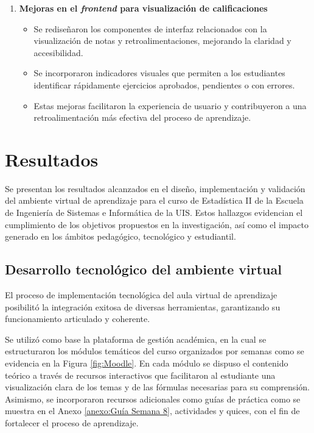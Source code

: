 \documentclass[letter,oneside,12pt,spanish]{report}
\begin{document}
\begin{enumerate}
	\item \textbf{Mejoras en el \textit{frontend} para visualización de calificaciones}  
	\begin{itemize}
		\item Se rediseñaron los componentes de interfaz relacionados con la visualización de notas y retroalimentaciones, mejorando la claridad y accesibilidad.
		\item Se incorporaron indicadores visuales que permiten a los estudiantes identificar rápidamente ejercicios aprobados, pendientes o con errores.
		\item Estas mejoras facilitaron la experiencia de usuario y contribuyeron a una retroalimentación más efectiva del proceso de aprendizaje.
	\end{itemize}
\end{enumerate}

\newpage

\chapter{Resultados}

Se presentan los resultados alcanzados en el diseño, implementación y validación del ambiente virtual de aprendizaje para el curso de Estadística II de la Escuela de Ingeniería de Sistemas e Informática de la UIS. Estos hallazgos evidencian el cumplimiento de los objetivos propuestos en la investigación, así como el impacto generado en los ámbitos pedagógico, tecnológico y estudiantil.

\section{Desarrollo tecnológico del ambiente virtual}

El proceso de implementación tecnológica del aula virtual de aprendizaje posibilitó la integración exitosa de diversas herramientas, garantizando su funcionamiento articulado y coherente.

Se utilizó como base la plataforma de gestión académica, en la cual se estructuraron los módulos temáticos del curso organizados por semanas como se evidencia en la Figura \ref{fig:Moodle}. En cada módulo se dispuso el contenido teórico a través de recursos interactivos que facilitaron al estudiante una visualización clara de los temas y de las fórmulas necesarias para su comprensión. Asimismo, se incorporaron recursos adicionales como guías de práctica como se muestra en el Anexo \ref{anexo:Guía Semana 8}, actividades y quices, con el fin de fortalecer el proceso de aprendizaje. 
\end{document}
